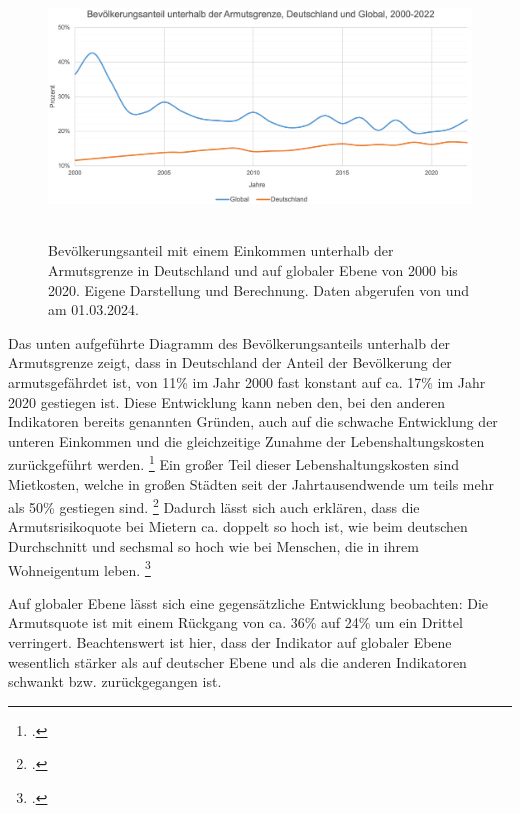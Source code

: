 \begin{figure}[h]
    \centering
    \includegraphics[height=6.9cm]{Bilder/Armutsgrenze2.png}
    \caption[Bevölkerungsanteil unterhalb der Armutsgrenze, Deutschland und global, 2000-2020]{Bevölkerungsanteil mit einem Einkommen unterhalb der Armutsgrenze in Deutschland und auf globaler Ebene von 2000 bis 2020. Eigene Darstellung und Berechnung. Daten abgerufen von \cite[][(global)]{wb_armutsquote_global_2022} und \cite[][(Deutschland)]{bmas_arb_armutsrisikoquote_2023} am 01.03.2024.}
    \label{fig:iso_norm3}
\end{figure}

Das unten aufgeführte Diagramm des Bevölkerungsanteils unterhalb der Armutsgrenze zeigt, dass in Deutschland der Anteil der Bevölkerung der armutsgefährdet ist, von 11\% im Jahr 2000 fast konstant auf ca. 17\% im Jahr 2020 gestiegen ist. Diese Entwicklung kann neben den, bei den anderen Indikatoren bereits genannten Gründen, auch auf die schwache Entwicklung der unteren Einkommen und die gleichzeitige Zunahme der Lebenshaltungskosten zurückgeführt werden. \footcite[Vgl. ][S. 17 (Country-Sheets)]{wir_2022} Ein gro{\ss}er Teil dieser Lebenshaltungskosten sind Mietkosten, welche in gro{\ss}en Städten seit der Jahrtausendwende um teils mehr als 50\% gestiegen sind. \footcite[Vgl. ][S. 494]{kholodilin_mietpreisbremse_2016} Dadurch lässt sich auch erklären, dass die Armutsrisikoquote bei Mietern ca. doppelt so hoch ist, wie beim deutschen Durchschnitt und sechsmal so hoch wie bei Menschen, die in ihrem Wohneigentum leben. \footcite[Vgl. ][S. 458]{grabka_einkommensverteilung_2018}

Auf globaler Ebene lässt sich eine gegensätzliche Entwicklung beobachten: Die Armutsquote ist mit einem Rückgang von ca. 36\% auf 24\% um ein Drittel verringert. Beachtenswert ist hier, dass der Indikator auf globaler Ebene wesentlich stärker als auf deutscher Ebene und als die anderen Indikatoren schwankt bzw. zurückgegangen ist. 

